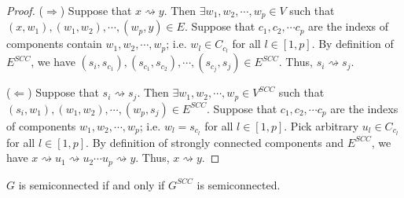 \begin{proof}
    ($\Longrightarrow$)
    Suppose that $x \rightsquigarrow y$.
    Then $\exists w_1, w_2, \cdots, w_p \in V$ such that
    $(x,w_1), (w_1,w_2), \cdots, (w_p,y) \in E$.
    Suppose that $c_1, c_2, \cdots c_p$ are the indexs of components contain $w_1, w_2, \cdots, w_p$;
    i.e. $w_l \in C_{c_l}$ for all $l \in [1,p]$.
    By definition of $E^{SCC}$,
    we have $(s_i,s_{c_1}),(s_{c_1},s_{c_2}), \cdots, (s_{c_j},s_j) \in E^{SCC}$.
    Thus, $s_i \rightsquigarrow s_j$.

    ($\Longleftarrow$)
    Suppose that $s_i \rightsquigarrow s_j$.
    Then $\exists w_1, w_2, \cdots, w_p \in V^{SCC}$ such that
    $(s_i,w_1), (w_1,w_2), \cdots, (w_p,s_j) \in E^{SCC}$.
    Suppose that $c_1, c_2, \cdots c_p$ are the indexs of components $w_1, w_2, \cdots, w_p$;
    i.e. $w_l = s_{c_l}$ for all $l \in [1,p]$.
    Pick arbitrary $u_l \in C_{c_l}$ for all $l \in [1,p]$.
    By definition of strongly connected components and $E^{SCC}$,
    we have $x \rightsquigarrow u_1 \rightsquigarrow u_2 \cdots u_p \rightsquigarrow y$.
    Thus, $x \rightsquigarrow y$.
\end{proof}

\begin{lemma}
    $G$ is semiconnected if and only if
    $G^{SCC}$ is semiconnected.
\end{lemma}

